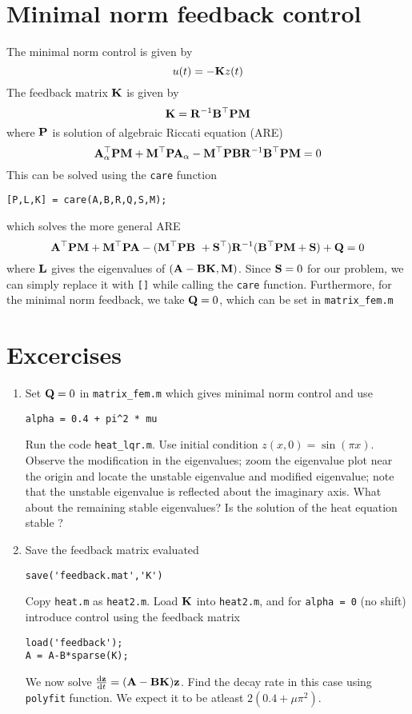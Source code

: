 \documentclass[12pt]{article}
\begin{document}
\section{Minimal norm feedback control}
The minimal norm control is given by
\[
u(t) = - {\mathbf K} z (t)
\]
The feedback matrix ${\mathbf K}$ is given by
\[
{\mathbf K} = {\mathbf R}^{-1} {\mathbf B}^\top {\mathbf P} {\mathbf M}
\]
where ${\mathbf P}$ is solution of algebraic Riccati equation (ARE)
\[
{\mathbf A}^\top_\alpha {\mathbf P} {\mathbf M} + {\mathbf M}^\top {\mathbf P} {\mathbf A}_\alpha - {\mathbf M}^\top {\mathbf P} {\mathbf B} {\mathbf R}^{-1} {\mathbf B}^\top {\mathbf P} {\mathbf M}  = 0
\]
This can be solved using the {\tt care} function
\begin{lstlisting}
[P,L,K] = care(A,B,R,Q,S,M);
\end{lstlisting}
which solves the more general ARE
\[
{\mathbf A}^\top {\mathbf P} {\mathbf M} + {\mathbf M}^\top {\mathbf P} {\mathbf A} - ({\mathbf M}^\top {\mathbf P} {\mathbf B} \ + {\mathbf S}^\top)  {\mathbf R}^{-1} ({\mathbf B}^\top {\mathbf P} {\mathbf M} +{\mathbf S}) + {\mathbf Q} = 0
\]
where ${\mathbf L}$ gives the eigenvalues of $({\mathbf A}- {\mathbf B} {\mathbf K},{\mathbf M})$. Since ${\mathbf S}=0$ for our problem, we can simply replace it with {\tt []} while calling the {\tt care} function. Furthermore, for the minimal norm feedback, we take ${\mathbf Q}=0$, which can be set in {\tt matrix\_fem.m}
\section{Excercises}

\begin{enumerate}
\item Set ${\mathbf Q}=0$ in {\tt matrix\_fem.m} which gives minimal norm control and use
\begin{lstlisting}
alpha = 0.4 + pi^2 * mu
\end{lstlisting}
Run the code {\tt heat\_lqr.m}. Use initial condition $z(x,0) = \sin(\pi x)$. Observe the modification in the eigenvalues; zoom the eigenvalue plot near the origin and locate the unstable eigenvalue and modified eigenvalue; note that the unstable eigenvalue is reflected about the imaginary axis. What about the remaining stable eigenvalues? Is the solution of the heat equation stable ?

\item Save the feedback matrix evaluated
\begin{lstlisting}
save('feedback.mat','K')
\end{lstlisting}
Copy {\tt heat.m} as {\tt heat2.m}. Load ${\mathbf K}$ into {\tt heat2.m}, and for {\tt alpha = 0} (no shift) introduce control using the feedback matrix
\begin{lstlisting}
load('feedback');
A = A-B*sparse(K);
\end{lstlisting}
We now solve $\frac{\textrm{d} {\mathbf z}}{\textrm{d} t}=({\mathbf A} - {\mathbf B}{\mathbf K}){\mathbf z}$. Find the decay rate in this case using {\tt polyfit} function. We expect it to be atleast $2(0.4 + \mu \pi^2)$.

\end{enumerate}
\end{document}
